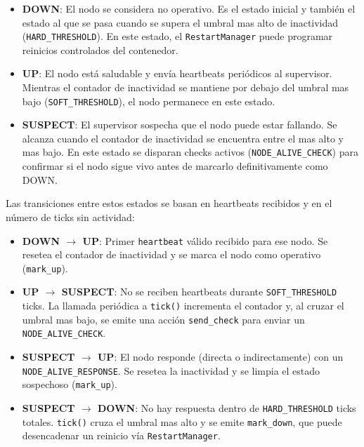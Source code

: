 \begin{itemize}
    \item \textbf{DOWN}: El nodo se considera no operativo. Es el estado inicial y también el estado al que se pasa cuando se supera el umbral mas alto de inactividad (\texttt{HARD\_THRESHOLD}). En este estado, el \texttt{RestartManager} puede programar reinicios controlados del contenedor.
    
    \item \textbf{UP}: El nodo está saludable y envía heartbeats periódicos al supervisor. Mientras el contador de inactividad se mantiene por debajo del umbral mas bajo (\texttt{SOFT\_THRESHOLD}), el nodo permanece en este estado.
    
    \item \textbf{SUSPECT}: El supervisor sospecha que el nodo puede estar fallando. Se alcanza cuando el contador de inactividad se encuentra entre el mas alto y mas bajo. En este estado se disparan checks activos (\texttt{NODE\_ALIVE\_CHECK}) para confirmar si el nodo sigue vivo antes de marcarlo definitivamente como DOWN.
\end{itemize}


Las transiciones entre estos estados se basan en heartbeats recibidos y en el número de ticks sin actividad:

\begin{itemize}
    \item \textbf{DOWN $\rightarrow$ UP}: Primer \texttt{heartbeat} válido recibido para ese nodo. Se resetea el contador de inactividad y se marca el nodo como operativo (\texttt{mark\_up}).

    \item \textbf{UP $\rightarrow$ SUSPECT}: No se reciben heartbeats durante \texttt{SOFT\_THRESHOLD} ticks. La llamada periódica a \texttt{tick()} incrementa el contador y, al cruzar el umbral mas bajo, se emite una acción \texttt{send\_check} para enviar un \texttt{NODE\_ALIVE\_CHECK}.

    \item \textbf{SUSPECT $\rightarrow$ UP}: El nodo responde (directa o indirectamente) con un \texttt{NODE\_ALIVE\_RESPONSE}. Se resetea la inactividad y se limpia el estado sospechoso (\texttt{mark\_up}).

    \item \textbf{SUSPECT $\rightarrow$ DOWN}: No hay respuesta dentro de \texttt{HARD\_THRESHOLD} ticks totales. \texttt{tick()} cruza el umbral mas alto y se emite \texttt{mark\_down}, que puede desencadenar un reinicio vía \texttt{RestartManager}.
\end{itemize}



